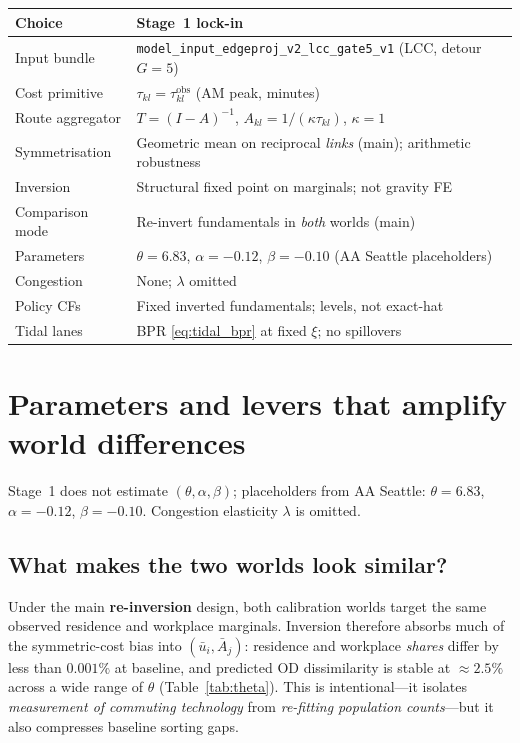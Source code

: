 \documentclass[12pt]{article}
\newcommand{\obs}{\mathrm{obs}}
\begin{document}
\begin{center}
\small
\begin{tabular}{p{}p{}}
\toprule
Choice & Stage~1 lock-in \\
\midrule
Input bundle & \texttt{model\_input\_edgeproj\_v2\_lcc\_gate5\_v1} (LCC, detour $G=5$) \\
Cost primitive & $\tau_{kl}=\tau^{\obs}_{kl}$ (AM peak, minutes) \\
Route aggregator & $T=(I-A)^{-1}$, $A_{kl}=1/(\kappa\tau_{kl})$, $\kappa=1$ \\
Symmetrisation & Geometric mean on reciprocal \emph{links} (main); arithmetic robustness \\
Inversion & Structural fixed point on marginals; not gravity FE \\
Comparison mode & Re-invert fundamentals in \emph{both} worlds (main) \\
Parameters & $\theta=6.83$, $\alpha=-0.12$, $\beta=-0.10$ (AA Seattle placeholders) \\
Congestion & None; $\lambda$ omitted \\
Policy CFs & Fixed inverted fundamentals; levels, not exact-hat \\
Tidal lanes & BPR \eqref{eq:tidal_bpr} at fixed $\xi$; no spillovers \\
\bottomrule
\end{tabular}
\end{center}

\section{Parameters and levers that amplify world differences}\label{sec:parameters}

Stage~1 does not estimate $(\theta,\alpha,\beta)$; placeholders from AA Seattle:
$\theta=6.83$, $\alpha=-0.12$, $\beta=-0.10$.
Congestion elasticity $\lambda$ is omitted.

\subsection{What makes the two worlds look similar?}

Under the main \textbf{re-inversion} design, both calibration worlds target the same
observed residence and workplace marginals.
Inversion therefore absorbs much of the symmetric-cost bias into
$(\bar u_i,\bar A_j)$: residence and workplace \emph{shares} differ by less than
$0.001\%$ at baseline, and predicted OD dissimilarity is stable at $\approx 2.5\%$
across a wide range of $\theta$ (Table~\ref{tab:theta}).
This is intentional---it isolates \emph{measurement of commuting technology} from
\emph{re-fitting population counts}---but it also compresses baseline sorting gaps.
\end{document}
